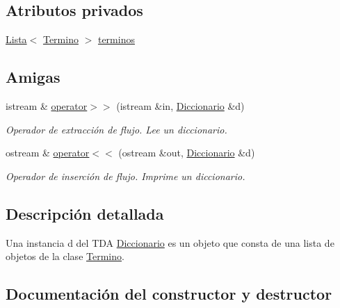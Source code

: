 \subsection*{Atributos privados}
\begin{DoxyCompactItemize}
\item 
\mbox{\hyperlink{classLista}{Lista}}$<$ \mbox{\hyperlink{classTermino}{Termino}} $>$ \mbox{\hyperlink{classDiccionario_a0e5b96246ec9ebd50c5e9290cd7f28a8}{terminos}}
\end{DoxyCompactItemize}
\subsection*{Amigas}
\begin{DoxyCompactItemize}
\item 
istream \& \mbox{\hyperlink{classDiccionario_acf72932a86e98d33aef771dde204a44d}{operator$>$$>$}} (istream \&in, \mbox{\hyperlink{classDiccionario}{Diccionario}} \&d)
\begin{DoxyCompactList}\small\item\em Operador de extracción de flujo. Lee un diccionario. \end{DoxyCompactList}\item 
ostream \& \mbox{\hyperlink{classDiccionario_a516b789839a40eb659c4e12c3e0c2b14}{operator$<$$<$}} (ostream \&out, \mbox{\hyperlink{classDiccionario}{Diccionario}} \&d)
\begin{DoxyCompactList}\small\item\em Operador de inserción de flujo. Imprime un diccionario. \end{DoxyCompactList}\end{DoxyCompactItemize}


\subsection{Descripción detallada}
Una instancia d del T\+DA \mbox{\hyperlink{classDiccionario}{Diccionario}} es un objeto que consta de una lista de objetos de la clase \mbox{\hyperlink{classTermino}{Termino}}. 

\subsection{Documentación del constructor y destructor}
\mbox{\label{classDiccionario_a3ca2e015f849faf2ee654d3be8bf69a2}} 
